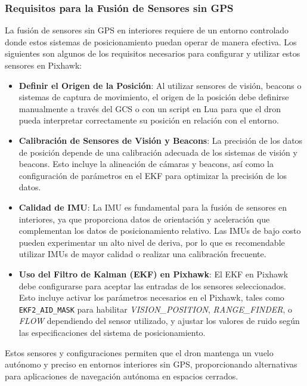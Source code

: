     \subsubsection{Requisitos para la Fusión de Sensores sin GPS}
    La fusión de sensores sin GPS en interiores requiere de un entorno controlado donde estos sistemas de posicionamiento puedan operar de manera efectiva. Los siguientes son algunos de los requisitos necesarios para configurar y utilizar estos sensores en Pixhawk:
    
    \begin{itemize}
        \item \textbf{Definir el Origen de la Posición}: Al utilizar sensores de visión, beacons o sistemas de captura de movimiento, el origen de la posición debe definirse manualmente a través del GCS o con un script en Lua para que el dron pueda interpretar correctamente su posición en relación con el entorno.
    
        \item \textbf{Calibración de Sensores de Visión y Beacons}: La precisión de los datos de posición depende de una calibración adecuada de los sistemas de visión y beacons. Esto incluye la alineación de cámaras y beacons, así como la configuración de parámetros en el EKF para optimizar la precisión de los datos.
    
        \item \textbf{Calidad de IMU}: La IMU es fundamental para la fusión de sensores en interiores, ya que proporciona datos de orientación y aceleración que complementan los datos de posicionamiento relativo. Las IMUs de bajo costo pueden experimentar un alto nivel de deriva, por lo que es recomendable utilizar IMUs de mayor calidad o realizar una calibración frecuente.
    
        \item \textbf{Uso del Filtro de Kalman (EKF) en Pixhawk}: El EKF en Pixhawk debe configurarse para aceptar las entradas de los sensores seleccionados. Esto incluye activar los parámetros necesarios en el Pixhawk, tales como \texttt{EKF2\_AID\_MASK} para habilitar \textit{VISION\_POSITION}, \textit{RANGE\_FINDER}, o \textit{FLOW} dependiendo del sensor utilizado, y ajustar los valores de ruido según las especificaciones del sistema de posicionamiento.
    \end{itemize}
    
    Estos sensores y configuraciones permiten que el dron mantenga un vuelo autónomo y preciso en entornos interiores sin GPS, proporcionando alternativas para aplicaciones de navegación autónoma en espacios cerrados.
    

   





